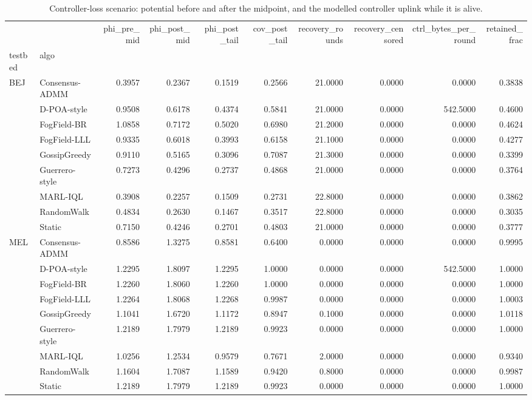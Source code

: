 \begin{table}
\caption{Controller-loss scenario: potential before and after the midpoint, and the modelled controller uplink while it is alive.}
\label{tab:table8_controller_loss}
\begin{tabular}{llrrrrrrrr}
\toprule
 &  & phi\_pre\_mid & phi\_post\_mid & phi\_post\_tail & cov\_post\_tail & recovery\_rounds & recovery\_censored & ctrl\_bytes\_per\_round & retained\_frac \\
testbed & algo &  &  &  &  &  &  &  &  \\
\midrule
\multirow[t]{9}{*}{BEJ} & Consensus-ADMM & 0.3957 & 0.2367 & 0.1519 & 0.2566 & 21.0000 & 0.0000 & 0.0000 & 0.3838 \\
 & D-POA-style & 0.9508 & 0.6178 & 0.4374 & 0.5841 & 21.0000 & 0.0000 & 542.5000 & 0.4600 \\
 & FogField-BR & 1.0858 & 0.7172 & 0.5020 & 0.6980 & 21.2000 & 0.0000 & 0.0000 & 0.4624 \\
 & FogField-LLL & 0.9335 & 0.6018 & 0.3993 & 0.6158 & 21.1000 & 0.0000 & 0.0000 & 0.4277 \\
 & GossipGreedy & 0.9110 & 0.5165 & 0.3096 & 0.7087 & 21.3000 & 0.0000 & 0.0000 & 0.3399 \\
 & Guerrero-style & 0.7273 & 0.4296 & 0.2737 & 0.4868 & 21.0000 & 0.0000 & 0.0000 & 0.3764 \\
 & MARL-IQL & 0.3908 & 0.2257 & 0.1509 & 0.2731 & 22.8000 & 0.0000 & 0.0000 & 0.3862 \\
 & RandomWalk & 0.4834 & 0.2630 & 0.1467 & 0.3517 & 22.8000 & 0.0000 & 0.0000 & 0.3035 \\
 & Static & 0.7150 & 0.4246 & 0.2701 & 0.4803 & 21.0000 & 0.0000 & 0.0000 & 0.3777 \\
\cline{1-10}
\multirow[t]{9}{*}{MEL} & Consensus-ADMM & 0.8586 & 1.3275 & 0.8581 & 0.6400 & 0.0000 & 0.0000 & 0.0000 & 0.9995 \\
 & D-POA-style & 1.2295 & 1.8097 & 1.2295 & 1.0000 & 0.0000 & 0.0000 & 542.5000 & 1.0000 \\
 & FogField-BR & 1.2260 & 1.8060 & 1.2260 & 1.0000 & 0.0000 & 0.0000 & 0.0000 & 1.0000 \\
 & FogField-LLL & 1.2264 & 1.8068 & 1.2268 & 0.9987 & 0.0000 & 0.0000 & 0.0000 & 1.0003 \\
 & GossipGreedy & 1.1041 & 1.6720 & 1.1172 & 0.8947 & 0.1000 & 0.0000 & 0.0000 & 1.0118 \\
 & Guerrero-style & 1.2189 & 1.7979 & 1.2189 & 0.9923 & 0.0000 & 0.0000 & 0.0000 & 1.0000 \\
 & MARL-IQL & 1.0256 & 1.2534 & 0.9579 & 0.7671 & 2.0000 & 0.0000 & 0.0000 & 0.9340 \\
 & RandomWalk & 1.1604 & 1.7087 & 1.1589 & 0.9420 & 0.8000 & 0.0000 & 0.0000 & 0.9987 \\
 & Static & 1.2189 & 1.7979 & 1.2189 & 0.9923 & 0.0000 & 0.0000 & 0.0000 & 1.0000 \\
\cline{1-10}
\bottomrule
\end{tabular}
\end{table}
